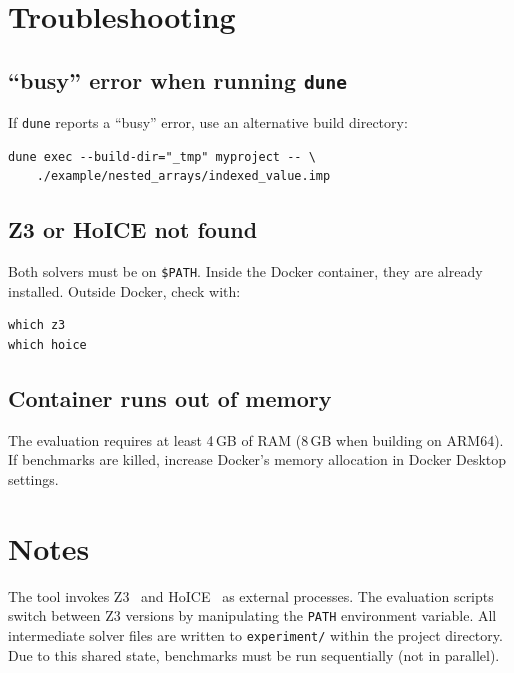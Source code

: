 \documentclass[a4paper,USenglish]{darts-v2021}
\begin{document}

\section{Troubleshooting}

\subsection*{``busy'' error when running \texttt{dune}}

If \texttt{dune} reports a ``busy'' error, use an alternative build directory:

\begin{verbatim}
dune exec --build-dir="_tmp" myproject -- \
    ./example/nested_arrays/indexed_value.imp
\end{verbatim}

\subsection*{Z3 or HoICE not found}

Both solvers must be on \texttt{\$PATH}. Inside the Docker container, they are
already installed. Outside Docker, check with:

\begin{verbatim}
which z3
which hoice
\end{verbatim}

\subsection*{Container runs out of memory}

The evaluation requires at least 4\,GB of RAM (8\,GB when building on ARM64).
If benchmarks are killed, increase Docker's memory allocation in Docker
Desktop settings.

\section{Notes}

The tool invokes Z3~\cite{z3} and HoICE~\cite{hoice} as external processes. The evaluation scripts switch between
Z3 versions by manipulating the \texttt{PATH} environment variable. All intermediate solver
files are written to \texttt{experiment/} within the project directory. Due to this shared
state, benchmarks must be run sequentially (not in parallel).


\end{document}
